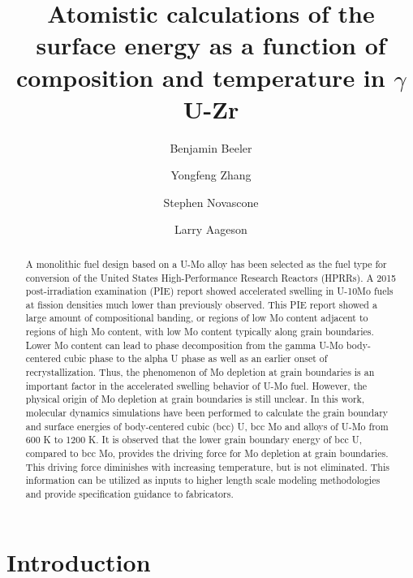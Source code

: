 \documentclass[review]{elsarticle}
\begin{document}
\begin{frontmatter}
\title{Atomistic calculations of the surface energy as a function of composition and temperature in $\gamma$U-Zr}


\author[inl]{Benjamin Beeler}
\author[inl]{Yongfeng Zhang}
\author[inl]{Stephen Novascone}
\author[inl]{Larry Aageson}
\address[inl]{Idaho National Laboratory, Idaho Falls, ID 83415}


\begin{abstract}



A monolithic fuel design based on a U-Mo alloy has been selected as the fuel type for conversion of the United States High-Performance Research Reactors (HPRRs). A 2015 post-irradiation examination (PIE) report showed accelerated swelling in U-10Mo fuels at fission densities much lower than previously observed. This PIE report showed a large amount of compositional banding, or regions of low Mo content adjacent to regions of high Mo content, with low Mo content typically along grain boundaries. Lower Mo content can lead to phase decomposition from the gamma U-Mo body-centered cubic phase to the alpha U phase as well as an earlier onset of recrystallization. Thus, the phenomenon of Mo depletion at grain boundaries is an important factor in the accelerated swelling behavior of U-Mo fuel. However, the physical origin of Mo depletion at grain boundaries is still unclear. In this work, molecular dynamics simulations have been performed to calculate the grain boundary and surface energies of body-centered cubic (bcc) U, bcc Mo and alloys of U-Mo from 600 K to 1200 K. It is observed that the lower grain boundary energy of bcc U, compared to bcc Mo, provides the driving force for Mo depletion at grain boundaries. This driving force diminishes with increasing temperature, but is not eliminated. This information can be utilized as inputs to higher length scale modeling methodologies and provide specification guidance to fabricators.


\end{abstract}
\end{frontmatter}

\linenumbers
\modulolinenumbers[5]

\section{Introduction}
\end{document}
